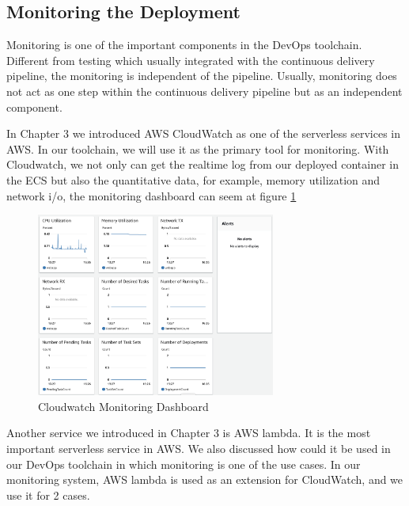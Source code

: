 \subsection{Monitoring the Deployment}
Monitoring is one of the important components in the DevOps toolchain. Different from testing which usually integrated with the continuous delivery pipeline, the monitoring is independent of the pipeline. Usually, monitoring does not act as one step within the continuous delivery pipeline but as an independent component.
\par
In Chapter 3 we introduced AWS CloudWatch as one of the serverless services in AWS. In our toolchain, we will use it as the primary tool for monitoring. With Cloudwatch, we not only can get the realtime log from our deployed container in the ECS but also the quantitative data, for example, memory utilization and network i/o, the monitoring dashboard can seem at figure \ref{fig:monitoring}
\begin{figure}[h]
    \centering
    \includegraphics[width=0.70\textwidth]{pics/monitoring.png}
    \caption{Cloudwatch Monitoring Dashboard}
    \label{fig:monitoring}
\end{figure}
Another service we introduced in Chapter 3 is AWS lambda. It is the most important serverless service in AWS. We also discussed how could it be used in our DevOps toolchain in which monitoring is one of the use cases. In our monitoring system, AWS lambda is used as an extension for CloudWatch, and we use it for 2 cases.

